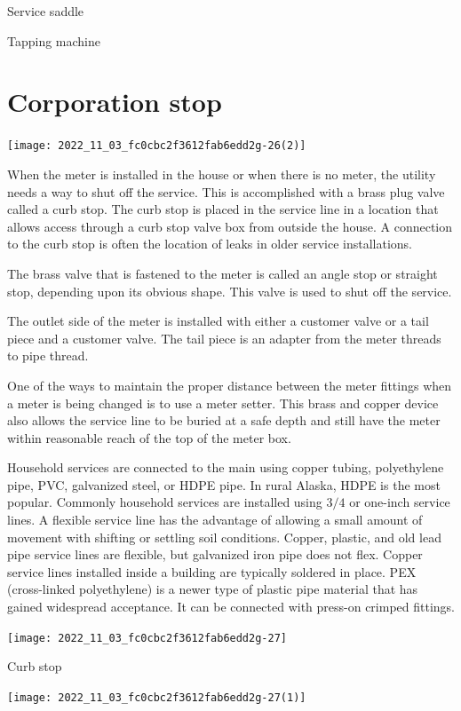 \documentclass[10pt]{article}
\begin{document}
Service saddle

Tapping machine

\section{Corporation stop}
\texttt{[image: 2022\_11\_03\_fc0cbc2f3612fab6edd2g-26(2)]}

When the meter is installed in the house or when there is no meter, the utility needs a way to shut off the service. This is accomplished with a brass plug valve called a curb stop. The curb stop is placed in the service line in a location that allows access through a curb stop valve box from outside the house. A connection to the curb stop is often the location of leaks in older service installations.

The brass valve that is fastened to the meter is called an angle stop or straight stop, depending upon its obvious shape. This valve is used to shut off the service.

The outlet side of the meter is installed with either a customer valve or a tail piece and a customer valve. The tail piece is an adapter from the meter threads to pipe thread.

One of the ways to maintain the proper distance between the meter fittings when a meter is being changed is to use a meter setter. This brass and copper device also allows the service line to be buried at a safe depth and still have the meter within reasonable reach of the top of the meter box.

Household services are connected to the main using copper tubing, polyethylene pipe, PVC, galvanized steel, or HDPE pipe. In rural Alaska, HDPE is the most popular. Commonly household services are installed using $3 / 4$ or one-inch service lines. A flexible service line has the advantage of allowing a small amount of movement with shifting or settling soil conditions. Copper, plastic, and old lead pipe service lines are flexible, but galvanized iron pipe does not flex. Copper service lines installed inside a building are typically soldered in place. PEX (cross-linked polyethylene) is a newer type of plastic pipe material that has gained widespread acceptance. It can be connected with press-on crimped fittings.

\texttt{[image: 2022\_11\_03\_fc0cbc2f3612fab6edd2g-27]}

Curb stop

\texttt{[image: 2022\_11\_03\_fc0cbc2f3612fab6edd2g-27(1)]}
\end{document}
